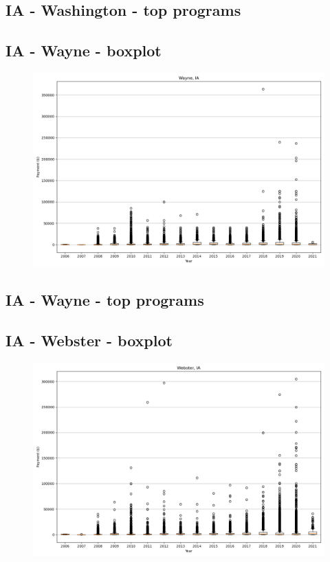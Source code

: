 \subsection*{IA - Washington - top programs}

\newpage
\subsection*{IA - Wayne - boxplot}
\begin{figure}[h]
\centering
\includegraphics[width=7in]{../output/boxplots/counties/Wayne-IA_boxplot.png}
\end{figure}


\subsection*{IA - Wayne - top programs}

\newpage
\subsection*{IA - Webster - boxplot}
\begin{figure}[h]
\centering
\includegraphics[width=7in]{../output/boxplots/counties/Webster-IA_boxplot.png}
\end{figure}


